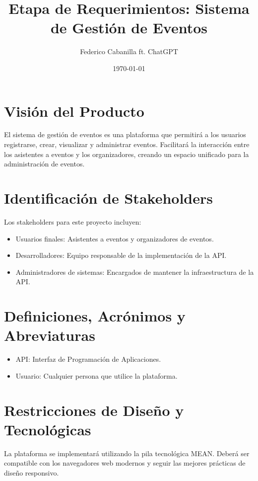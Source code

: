 \documentclass[a4paper]{article}
\title{Etapa de Requerimientos: Sistema de Gestión de Eventos}
\author{Federico Cabanilla ft. ChatGPT}
\date{\today}
\begin{document}
\maketitle

\section{Visión del Producto}
El sistema de gestión de eventos es una plataforma que permitirá a los usuarios registrarse, crear, visualizar y administrar eventos. Facilitará la interacción entre los asistentes a eventos y los organizadores, creando un espacio unificado para la administración de eventos.

\section{Identificación de Stakeholders}
Los stakeholders para este proyecto incluyen:
\begin{itemize}
    \item Usuarios finales: Asistentes a eventos y organizadores de eventos.
    \item Desarrolladores: Equipo responsable de la implementación de la API.
    \item Administradores de sistemas: Encargados de mantener la infraestructura de la API.
\end{itemize}

\section{Definiciones, Acrónimos y Abreviaturas}
\begin{itemize}
    \item API: Interfaz de Programación de Aplicaciones.
    \item Usuario: Cualquier persona que utilice la plataforma.
\end{itemize}

\section{Restricciones de Diseño y Tecnológicas}
La plataforma se implementará utilizando la pila tecnológica MEAN. Deberá ser compatible con los navegadores web modernos y seguir las mejores prácticas de diseño responsivo.
\end{document}

